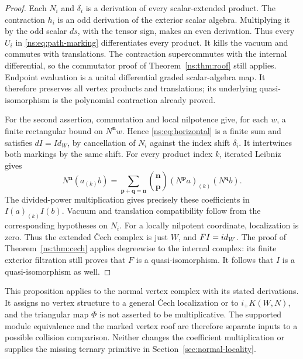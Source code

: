 \begin{proof}
Each \(N_i\) and \(\delta_i\) is a derivation of every
scalar-extended product.  The contraction \(h_i\) is an odd
derivation of the exterior scalar algebra.  Multiplying it by the
odd scalar \(ds\), with the tensor sign, makes an even derivation.
Thus every \(U_i\) in \eqref{ns:eq:path-marking} differentiates
every product.  It kills the vacuum and commutes with translations.
The contraction supercommutes with the internal differential, so
the commutator proof of Theorem~\ref{ns:thm:roof} still applies.
Endpoint evaluation is a unital differential graded scalar-algebra
map.  It therefore preserves all vertex products and translations;
its underlying quasi-isomorphism is the polynomial contraction
already proved.

For the second assertion, commutation and local nilpotence give,
for each \(w\), a finite rectangular bound on
\(N^{\boldsymbol n}w\).  Hence \eqref{ns:eq:horizontal} is a
finite sum and satisfies \(dI=I d_W\), by cancellation of
\(N_i\) against the index shift \(\delta_i\).
It intertwines both markings by the same shift.
For every product index \(k\), iterated Leibniz gives
\[
 N^{\boldsymbol n}(a_{(k)}b)
   =\sum_{\boldsymbol p+\boldsymbol q=\boldsymbol n}
        \binom{\boldsymbol n}{\boldsymbol p}
        (N^{\boldsymbol p}a)_{(k)}(N^{\boldsymbol q}b).
\]
The divided-power multiplication gives precisely these coefficients
in \(I(a)_{(k)}I(b)\).  Vacuum and translation compatibility follow
from the corresponding hypotheses on \(N_i\).
For a locally nilpotent coordinate, localization is zero.
Thus the extended \v{C}ech complex is just \(W\), and
\(FI=id_W\).  The proof of Theorem~\ref{ns:thm:cech} applies
degreewise to the internal complex: its finite exterior filtration
still proves that \(F\) is a quasi-isomorphism.
It follows that \(I\) is a quasi-isomorphism as well.
\end{proof}

This proposition applies to the normal vertex complex with its
stated derivations.  It assigns no vertex structure to a general
\v{C}ech localization or to \(i_+K(W,N)\), and the triangular
map \(\Phi\) is not asserted to be multiplicative.
The supported module equivalence and the marked vertex roof are
therefore separate inputs to a possible collision comparison.
Neither changes the coefficient multiplication or supplies the
missing ternary primitive in Section~\ref{sec:normal-locality}.
